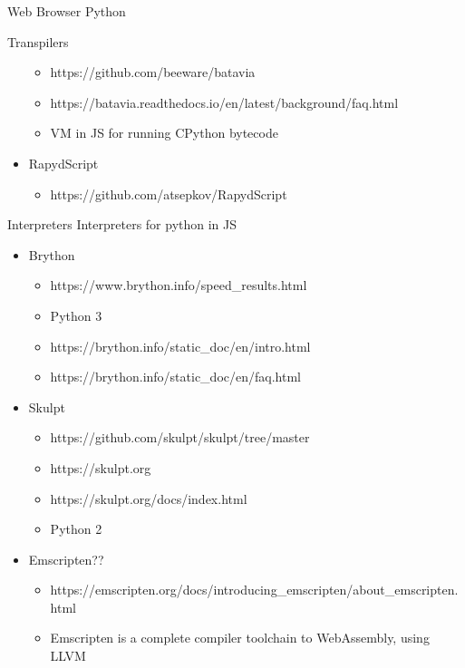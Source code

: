 \begin{block}{Web Browser Python}
\begin{block}{Transpilers}
\begin{itemize}
  \begin{itemize}
  \tightlist
  \item
    https://github.com/beeware/batavia
  \item
    https://batavia.readthedocs.io/en/latest/background/faq.html
  \item
    VM in JS for running CPython bytecode
  \end{itemize}
\item
  RapydScript

  \begin{itemize}
  \tightlist
  \item
    https://github.com/atsepkov/RapydScript
  \end{itemize}
\end{itemize}
\end{block}

\begin{block}{Interpreters}
\label{notes__03100-python.md__interpreters}
Interpreters for python in JS

\begin{itemize}
\tightlist
\item
  Brython

  \begin{itemize}
  \tightlist
  \item
    https://www.brython.info/speed\_results.html
  \item
    Python 3
  \item
    https://brython.info/static\_doc/en/intro.html
  \item
    https://brython.info/static\_doc/en/faq.html
  \end{itemize}
\item
  Skulpt

  \begin{itemize}
  \tightlist
  \item
    https://github.com/skulpt/skulpt/tree/master
  \item
    https://skulpt.org
  \item
    https://skulpt.org/docs/index.html
  \item
    Python 2
  \end{itemize}
\item
  Emscripten??

  \begin{itemize}
  \tightlist
  \item
    https://emscripten.org/docs/introducing\_emscripten/about\_emscripten.html
  \item
    Emscripten is a complete compiler toolchain to WebAssembly, using LLVM
  \end{itemize}
\end{itemize}
\end{block}
\end{block}


